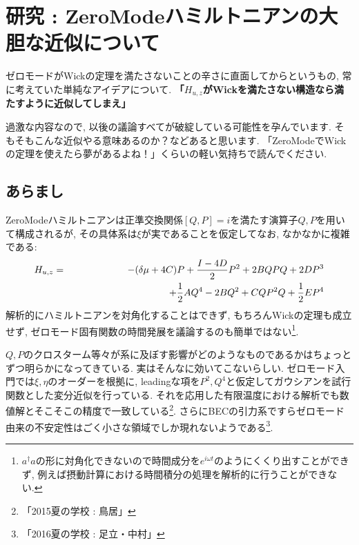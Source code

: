 \documentclass[10.5pt,a4paper]{jreport}
\begin{document}

\chapter{研究 : ZeroModeハミルトニアンの大胆な近似について}
ゼロモードがWickの定理を満たさないことの辛さに直面してからというもの, 常に考えていた単純なアイデアについて. \textbf{「$H_{u, z}$がWickを満たさない構造なら満たすように近似してしまえ」}

過激な内容なので, 以後の議論すべてが破綻している可能性を孕んでいます. そもそもこんな近似やる意味あるのか？などあると思います. 「ZeroModeでWickの定理を使えたら夢があるよね！」くらいの軽い気持ちで読んでください. 
\section{あらまし}
ZeroModeハミルトニアンは正準交換関係$[Q, P] = i$を満たす演算子$Q, P$を用いて構成されるが, その具体系は$\xi$が実であることを仮定してなお, なかなかに複雑である:
\begin{eqnarray}
  \nonumber H_{u, z} &=& -(\delta\mu +4C)P + \frac{I - 4D}{2}P^2 + 2BQPQ + 2DP^3\\
  &&\hspace{3.5cm} +\frac{1}{2}AQ^4- 2BQ^2 + CQP^2Q + \frac{1}{2}EP^4
\end{eqnarray}
解析的にハミルトニアンを対角化することはできず, もちろんWickの定理も成立せず, ゼロモード固有関数の時間発展を議論するのも簡単ではない\footnote{$a^\dagger a$の形に対角化できないので時間成分を$e^{i\omega t}$のようにくくり出すことができず, 例えば摂動計算における時間積分の処理を解析的に行うことができない. }.

$Q, P$のクロスターム等々が系に及ぼす影響がどのようなものであるかはちょっとずつ明らかになってきている. 実はそんなに効いてこないらしい. 
ゼロモード入門では$\xi, \eta$のオーダーを根拠に, leadingな項を$P^2, Q^4$と仮定してガウシアンを試行関数とした変分近似を行っている. それを応用した有限温度における解析でも数値解とそこそこの精度で一致している\footnote{「2015夏の学校 : 鳥居」}. さらにBECの引力系ですらゼロモード由来の不安定性はごく小さな領域でしか現れないようである\footnote{「2016夏の学校 : 足立・中村」}.
\end{document}
